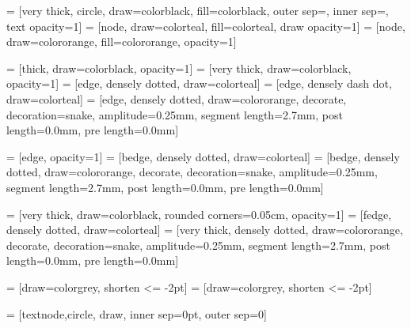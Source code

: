  = [very thick, circle, draw=colorblack, fill=colorblack, outer sep=\nodespacing, inner sep=\nodesize, text opacity=1]  %
 = [node, draw=colorteal, fill=colorteal, draw opacity=1]
 = [node, draw=colororange, fill=colororange, opacity=1]

 = [thick, draw=colorblack, opacity=1]
 = [very thick, draw=colorblack, opacity=1]
 = [edge, densely dotted, draw=colorteal]
 = [edge, densely dash dot, draw=colorteal]
 = [edge, densely dotted, draw=colororange, decorate, decoration={snake, amplitude=0.25mm, segment length=2.7mm, post length=0.0mm, pre length=0.0mm}]

 = [edge, opacity=1]
 = [bedge, densely dotted, draw=colorteal]
 = [bedge, densely dotted, draw=colororange, decorate, decoration={snake, amplitude=0.25mm, segment length=2.7mm, post length=0.0mm, pre length=0.0mm}]

 = [very thick, draw=colorblack, rounded corners=0.05cm, opacity=1]
 = [fedge, densely dotted, draw=colorteal]
 = [very thick, densely dotted, draw=colororange, decorate, decoration={snake, amplitude=0.25mm, segment length=2.7mm, post length=0.0mm, pre length=0.0mm}]

 = [draw=colorgrey, shorten <= -2pt]
 = [draw=colorgrey, shorten <= -2pt]



\usetikzlibrary{pgfplots.groupplots}
\usetikzlibrary{shapes.geometric}
\usetikzlibrary{positioning,fit,shapes.geometric,backgrounds, calc}
\usetikzlibrary{arrows,decorations.markings}
\usetikzlibrary{shapes.arrows}
\usetikzlibrary{patterns}
 = [textnode,circle, draw, inner sep=0pt, outer sep=0]
                    
